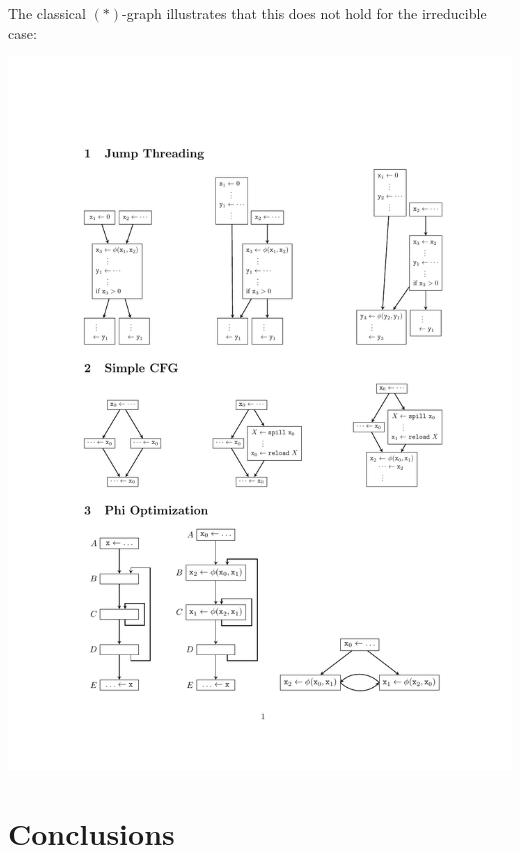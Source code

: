 The classical $(\ast)$-graph illustrates that this does not hold for the irreducible case:
\begin{center}
	\includegraphics{ast_graph.pdf}
\end{center}


\section{Conclusions}

